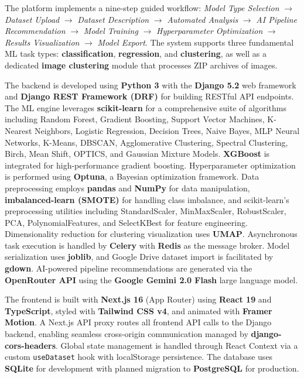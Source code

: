 \documentclass[12pt,a4paper]{report}
\begin{document}
The platform implements a nine-step guided workflow: \textit{Model Type Selection} $\rightarrow$ \textit{Dataset Upload} $\rightarrow$ \textit{Dataset Description} $\rightarrow$ \textit{Automated Analysis} $\rightarrow$ \textit{AI Pipeline Recommendation} $\rightarrow$ \textit{Model Training} $\rightarrow$ \textit{Hyperparameter Optimization} $\rightarrow$ \textit{Results Visualization} $\rightarrow$ \textit{Model Export}. The system supports three fundamental ML task types: \textbf{classification}, \textbf{regression}, and \textbf{clustering}, as well as a dedicated \textbf{image clustering} module that processes ZIP archives of images.

The backend is developed using \textbf{Python 3} with the \textbf{Django 5.2} web framework and \textbf{Django REST Framework (DRF)} for building RESTful API endpoints. The ML engine leverages \textbf{scikit-learn} for a comprehensive suite of algorithms including Random Forest, Gradient Boosting, Support Vector Machines, K-Nearest Neighbors, Logistic Regression, Decision Trees, Naive Bayes, MLP Neural Networks, K-Means, DBSCAN, Agglomerative Clustering, Spectral Clustering, Birch, Mean Shift, OPTICS, and Gaussian Mixture Models. \textbf{XGBoost} is integrated for high-performance gradient boosting. Hyperparameter optimization is performed using \textbf{Optuna}, a Bayesian optimization framework. Data preprocessing employs \textbf{pandas} and \textbf{NumPy} for data manipulation, \textbf{imbalanced-learn (SMOTE)} for handling class imbalance, and scikit-learn's preprocessing utilities including StandardScaler, MinMaxScaler, RobustScaler, PCA, PolynomialFeatures, and SelectKBest for feature engineering. Dimensionality reduction for clustering visualization uses \textbf{UMAP}. Asynchronous task execution is handled by \textbf{Celery} with \textbf{Redis} as the message broker. Model serialization uses \textbf{joblib}, and Google Drive dataset import is facilitated by \textbf{gdown}. AI-powered pipeline recommendations are generated via the \textbf{OpenRouter API} using the \textbf{Google Gemini 2.0 Flash} large language model.

The frontend is built with \textbf{Next.js 16} (App Router) using \textbf{React 19} and \textbf{TypeScript}, styled with \textbf{Tailwind CSS v4}, and animated with \textbf{Framer Motion}. A Next.js API proxy routes all frontend API calls to the Django backend, enabling seamless cross-origin communication managed by \textbf{django-cors-headers}. Global state management is handled through React Context via a custom \texttt{useDataset} hook with localStorage persistence. The database uses \textbf{SQLite} for development with planned migration to \textbf{PostgreSQL} for production.
\end{document}
